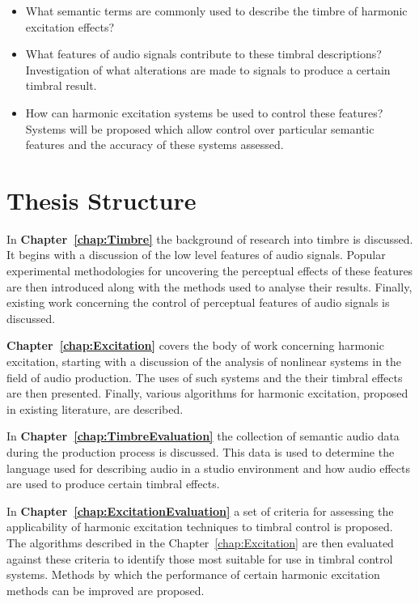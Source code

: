 	\begin{itemize}
		\item What semantic terms are commonly used to describe the timbre of harmonic excitation effects? 
		\item What features of audio signals contribute to these timbral descriptions? Investigation of what
		      alterations are made to signals to produce a certain timbral result.
		\item How can harmonic excitation systems be used to control these features? Systems will be proposed which
		      allow control over particular semantic features and the accuracy of these systems assessed.
	\end{itemize}

\section{Thesis Structure}
\label{sec:Introduction-ThesisStructure}
	In {\bf{Chapter~\ref{chap:Timbre}}} the background of research into timbre is discussed. It begins with a discussion
	of the low level features of audio signals. Popular experimental methodologies for uncovering the perceptual effects
	of these features are then introduced along with the methods used to analyse their results. Finally, existing work
	concerning the control of perceptual features of audio signals is discussed.

	{\bf{Chapter~\ref{chap:Excitation}}} covers the body of work concerning harmonic excitation, starting with a
	discussion of the analysis of nonlinear systems in the field of audio production. The uses of such systems and the
	their timbral effects are then presented. Finally, various algorithms for harmonic excitation, proposed in existing
	literature, are described.

	In {\bf{Chapter~\ref{chap:TimbreEvaluation}}} the collection of semantic audio data during the production process is
	discussed. This data is used to determine the language used for describing audio in a studio environment and how
	audio effects are used to produce certain timbral effects.

	In {\bf{Chapter~\ref{chap:ExcitationEvaluation}}} a set of criteria for assessing the applicability of harmonic
	excitation techniques to timbral control is proposed. The algorithms described in the Chapter~\ref{chap:Excitation}
	are then evaluated against these criteria to identify those most suitable for use in timbral control systems.
	Methods by which the performance of certain harmonic excitation methods can be improved are proposed.

